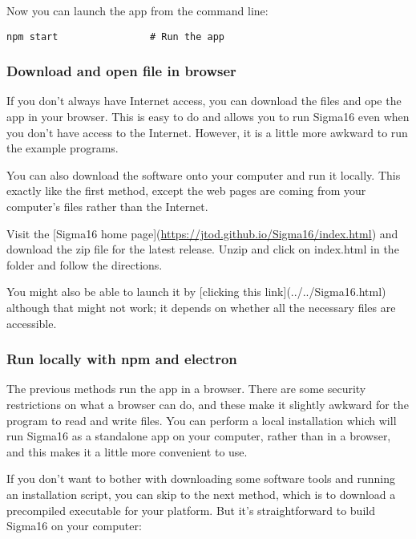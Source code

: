 \documentclass[11pt]{article}
\begin{document}
Now you can launch the app from the command line:

\begin{verbatim}
npm start                # Run the app
\end{verbatim}

\subsubsection*{Download and open file in browser}
\label{sec:org0f0d009}

If you don't always have Internet access, you can download the files
and ope the app in your browser.  This is easy to do and allows you to
run Sigma16 even when you don't have access to the Internet.  However,
it is a little more awkward to run the example programs.

You can also download the software onto your computer and run it
locally.  This exactly like the first method, except the web pages are
coming from your computer's files rather than the Internet.

Visit the [Sigma16 home
page](\url{https://jtod.github.io/Sigma16/index.html}) and download the zip
file for the latest release.  Unzip and click on index.html in the
folder and follow the directions.

You might also be able to launch it by [clicking this
link](../../Sigma16.html) although that might not work; it depends on
whether all the necessary files are accessible.

\subsubsection*{Run locally with npm and electron}
\label{sec:org3cb88db}

The previous methods run the app in a browser.  There are some
security restrictions on what a browser can do, and these make it
slightly awkward for the program to read and write files.  You can
perform a local installation which will run Sigma16 as a standalone
app on your computer, rather than in a browser, and this makes it a
little more convenient to use.

If you don't want to bother with downloading some software tools and
running an installation script, you can skip to the next method, which
is to download a precompiled executable for your platform.  But it's
straightforward to build Sigma16 on your computer:
\end{document}
